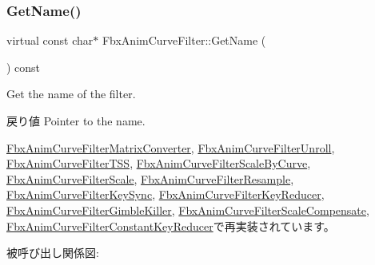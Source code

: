 \mbox{\label{class_fbx_anim_curve_filter_abd559d5052fbb072042e59241940a35c}} 
\subsubsection{\texorpdfstring{Get\+Name()}{GetName()}}
{\footnotesize\ttfamily virtual const char$\ast$ Fbx\+Anim\+Curve\+Filter\+::\+Get\+Name (\begin{DoxyParamCaption}{ }\end{DoxyParamCaption}) const\hspace{0.3cm}{\ttfamily [virtual]}}

Get the name of the filter. \begin{DoxyReturn}{戻り値}
Pointer to the name. 
\end{DoxyReturn}


\hyperlink{class_fbx_anim_curve_filter_matrix_converter_a264eb163214f398627f4b8e20631b1ab}{Fbx\+Anim\+Curve\+Filter\+Matrix\+Converter}, \hyperlink{class_fbx_anim_curve_filter_unroll_a01282004cc60febeff844d9c44f94e5c}{Fbx\+Anim\+Curve\+Filter\+Unroll}, \hyperlink{class_fbx_anim_curve_filter_t_s_s_acf96262688c855b1c9b5ead93247e758}{Fbx\+Anim\+Curve\+Filter\+T\+SS}, \hyperlink{class_fbx_anim_curve_filter_scale_by_curve_a99e99cf6db71774d394010c4cd295fdb}{Fbx\+Anim\+Curve\+Filter\+Scale\+By\+Curve}, \hyperlink{class_fbx_anim_curve_filter_scale_afffa13f0b3bbdcaa0a6d88d6aea2c83f}{Fbx\+Anim\+Curve\+Filter\+Scale}, \hyperlink{class_fbx_anim_curve_filter_resample_a67303296eba915d2a9fde63c2557c3f9}{Fbx\+Anim\+Curve\+Filter\+Resample}, \hyperlink{class_fbx_anim_curve_filter_key_sync_acf561aadd8d5f4b35826044c6d50b6b4}{Fbx\+Anim\+Curve\+Filter\+Key\+Sync}, \hyperlink{class_fbx_anim_curve_filter_key_reducer_a86d571282e550eecbf7afb0f198ce91f}{Fbx\+Anim\+Curve\+Filter\+Key\+Reducer}, \hyperlink{class_fbx_anim_curve_filter_gimble_killer_a224d34ab4b2a7f508de5679402c3711f}{Fbx\+Anim\+Curve\+Filter\+Gimble\+Killer}, \hyperlink{class_fbx_anim_curve_filter_scale_compensate_af6564ed47826563b148a2c41901e4f03}{Fbx\+Anim\+Curve\+Filter\+Scale\+Compensate}, \hyperlink{class_fbx_anim_curve_filter_constant_key_reducer_a1f856490df5d301d1c1e202958a3240c}{Fbx\+Anim\+Curve\+Filter\+Constant\+Key\+Reducer}で再実装されています。

被呼び出し関係図\+:
\mbox{\label{class_fbx_anim_curve_filter_af428acfb5850fe1d91d7d99bfc5ccab2}} 
